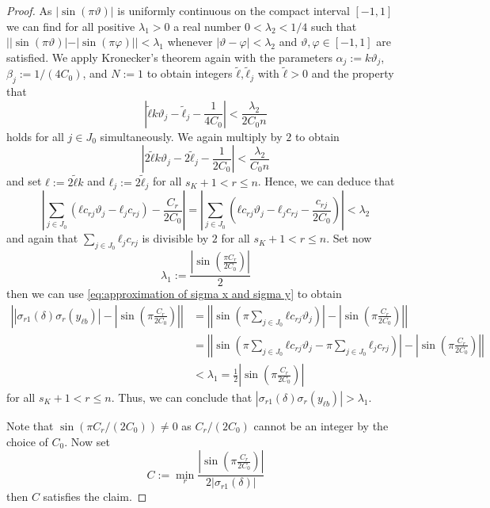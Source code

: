 \begin{proof}
  As \(|\sin(π ϑ)|\) is uniformly continuous on the compact interval \([-1, 1]\)
  we can find for all positive \(λ_1 > 0\) a real number \(0 < λ_2 < 1/4\) such
  that \(||\sin(π ϑ)| - |\sin(π φ)|| < λ_1\) whenever \(|ϑ - φ| < λ_2\) and
  \(ϑ, φ ∈ [-1, 1]\) are satisfied. We apply Kronecker's theorem again with the
  parameters \(α_j := k ϑ_j\), \(β_j := 1/(4 C_0)\), and \(N := 1\) to obtain
  integers \(\tilde{ℓ}, \tilde{ℓ}_j\) with \(\tilde{ℓ} > 0\) and the property
  that
  \[
    \left\vert \tilde{ℓ} k ϑ_j - \tilde{ℓ}_j - \frac{1}{4 C_0}\right\vert
     < \frac{λ_2}{2 C_0 n}
  \]
  holds for all \(j ∈ J_0\) simultaneously. We again multiply by \(2\) to obtain
  \[
  \left\vert 2 \tilde{ℓ} k ϑ_j - 2 \tilde{ℓ}_j - \frac{1}{2 C_0}\right\vert
    < \frac{λ_2}{C_0 n}
  \]
  and set \(ℓ := 2 \tilde{ℓ} k\) and \(ℓ_j := 2 \tilde{ℓ}_j\) for all \(s_K + 1
  < r ≤ n\). Hence, we can deduce that
  \[
    \left|
      \sum_{j ∈ J_0} \left( ℓ c_{rj} ϑ_j - ℓ_j c_{rj}\right) - \frac{C_r}{2 C_0}
    \right| =
    \left|
      \sum_{j ∈ J_0}
        \left( ℓ c_{rj} ϑ_j - ℓ_j c_{rj} - \frac{c_{rj}}{2 C_0}\right)
    \right| < λ_2
  \]
  and again that \(\sum_{j ∈ J_0}ℓ_j c_{rj}\) is divisible by \(2\) for all
  \(s_K + 1 < r ≤ n\). Set now
  \[
    λ_1 :=  \frac{
      \left\vert\sin\left(
        \frac{π C_r}{2 C_0}
      \right) \right\vert}
      {2} 
  \]
  then we can use \eqref{eq:approximation of sigma x and sigma y} to obtain
  \begin{align*}
    \left\vert
      |σ_{r1}(δ) σ_r (y_{ℓb})| -
        \left| \sin\left( π \frac{C_r}{2 C_0} \right)\right|
    \right\vert &=
      \left|\left|
          \sin \left(π \sum_{j ∈ J_0} ℓ c_{rj} ϑ_j \right)
        \right| -
        \left\vert \sin\left( π \frac{C_r}{2 C_0} \right)\right\vert
       \right\vert \\
      &= \left|\left| \sin \left(π \sum_{j ∈ J_0} ℓ c_{rj} ϑ_j  -
              π \sum_{j ∈ J_0}ℓ_j c_{rj}\right)
          \right| -
          \left\vert \sin\left( π \frac{C_r}{2 C_0} \right)\right\vert
        \right| \\
      &< λ_1 = \frac{1}{2} \left| \sin \left( π \frac{C_r}{2 C_0}\right)\right|
  \end{align*}
  for all \(s_K + 1 < r ≤ n\). Thus, we can conclude that \(|σ_{r1}(δ) σ_r
  (y_{ℓb})| > λ_1\).

  Note that \(\sin(π C_r / (2 C_0)) ≠ 0\) as \(C_r / (2 C_0)\) cannot be an
  integer by the choice of \(C_0\). Now set
  \[
    C :=
      \min_{r}
        \frac{\left|
          \sin \left(π \frac{C_r}{2 C_0}\right)
        \right|}{2 |σ_{r1}(δ)|}
  \]
  then \(C\) satisfies the claim.
\end{proof}

